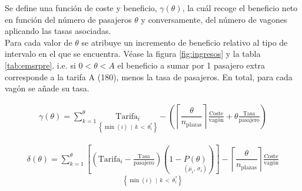 \documentclass[12pt]{article}
\begin{document}
Se define una función de coste y beneficio, $\gamma(\theta)$, la cuál recoge el beneficio neto en función del número de pasajeros $\theta$ y conversamente, del número de vagones aplicando las tasas asociadas.\\


Para cada valor de $\theta$ se atribuye un incremento de beneficio relativo al tipo de intervalo en el que se encuentra. Véase la figura \ref{fig:ingresos} y la tabla \ref{tab:emsrpre}. i.e. si $0 < \theta < A$ el beneficio a sumar por 1 pasajero extra corresponde a la tarifa A (180), menos la tasa de pasajeros. En total, para cada vagón se añade su tasa.


\begin{align}
\gamma(\theta) = \sum_{k=1}^\theta \underset{\left\{\min(i) \, \mid \, k \, < \, \theta_i^*\right \}}{\text{Tarifa}_i} - \left(\left\lceil\dfrac{\theta}{n_{\text{plazas}}}\right\rceil  \frac{\text{Coste}}{\text{vagón}} + \theta\frac{\text{Tasa}}{\text{pasajero}} \right) \label{eq:delta}
\end{align}

\begin{align}
\delta(\theta) = \sum_{k = 1}^\theta \underset{\left\{\min(i) \, \mid \, k \, < \, \theta_i^*\right \}}{\left[\left(\text{Tarifa}_i -\frac{\text{Tasa}}{\text{pasajero}}\right)\left(1 - \underset{(\overline{\mu}_i, \, \sigma_i)}{P(\theta)}\right)\right]} - \left\lceil\dfrac{\theta}{n_{\text{plazas}}}\right\rceil \frac{\text{Coste}}{\text{vagón}} \label{eq:deltastar}
\end{align}
\end{document}
